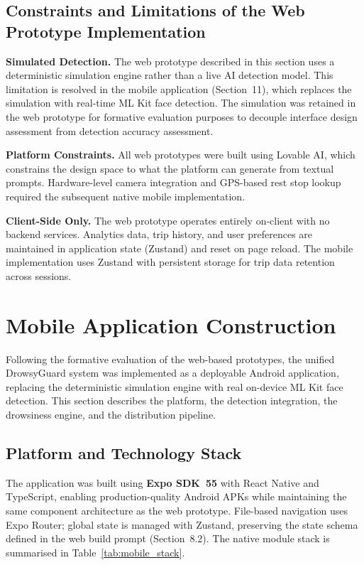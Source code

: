 \documentclass[sigconf]{acmart}
\begin{document}
\subsection{Constraints and Limitations of the Web Prototype Implementation}

\textbf{Simulated Detection.} The web prototype described in this section uses a deterministic simulation engine rather than a live AI detection model. This limitation is resolved in the mobile application (Section~11), which replaces the simulation with real-time ML Kit face detection. The simulation was retained in the web prototype for formative evaluation purposes to decouple interface design assessment from detection accuracy assessment.

\textbf{Platform Constraints.} All web prototypes were built using Lovable AI, which constrains the design space to what the platform can generate from textual prompts. Hardware-level camera integration and GPS-based rest stop lookup required the subsequent native mobile implementation.

\textbf{Client-Side Only.} The web prototype operates entirely on-client with no backend services. Analytics data, trip history, and user preferences are maintained in application state (Zustand) and reset on page reload. The mobile implementation uses Zustand with persistent storage for trip data retention across sessions.


\section{Mobile Application Construction}

Following the formative evaluation of the web-based prototypes, the unified DrowsyGuard system was implemented as a deployable Android application, replacing the deterministic simulation engine with real on-device ML Kit face detection. This section describes the platform, the detection integration, the drowsiness engine, and the distribution pipeline.

\subsection{Platform and Technology Stack}

The application was built using \textbf{Expo SDK~55} with React Native and TypeScript, enabling production-quality Android APKs while maintaining the same component architecture as the web prototype. File-based navigation uses Expo Router; global state is managed with Zustand, preserving the state schema defined in the web build prompt (Section~8.2). The native module stack is summarised in Table~\ref{tab:mobile_stack}.
\end{document}
